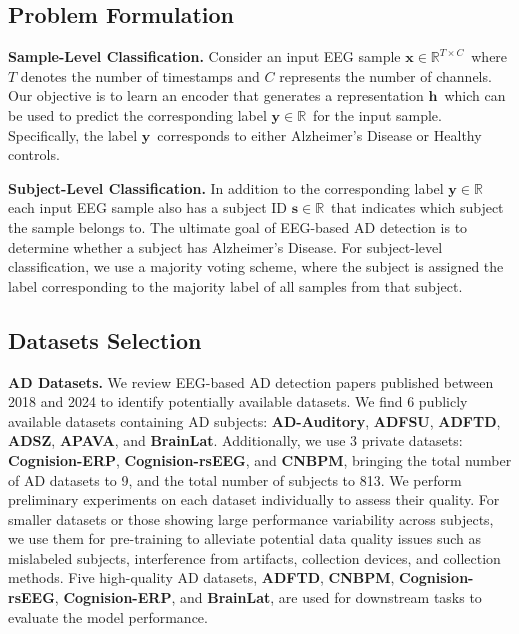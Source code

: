 




\subsection{Problem Formulation}
\label{sub:problem_formulation}


\textbf{Sample-Level Classification.}  
Consider an input EEG sample $\bm{x} \in \mathbb{R}^{T \times C}$\, where $T$ denotes the number of timestamps and $C$ represents the number of channels. Our objective is to learn an encoder that generates a representation $\bm{h}$\, which can be used to predict the corresponding label $\bm{y} \in \mathbb{R}$\ for the input sample. Specifically, the label $\bm{y}$\ corresponds to either Alzheimer's Disease or Healthy controls.

\textbf{Subject-Level Classification.}
In addition to the corresponding label $\bm{y} \in \mathbb{R}$\, each input EEG sample also has a subject ID $\bm{s} \in \mathbb{R}$\ that indicates which subject the sample belongs to. The ultimate goal of EEG-based AD detection is to determine whether a subject has Alzheimer's Disease. For subject-level classification, we use a majority voting scheme, where the subject is assigned the label corresponding to the majority label of all samples from that subject.



\subsection{Datasets Selection}
\label{sub:datasets_selection}

\textbf{AD Datasets.} We review EEG-based AD detection papers published between 2018 and 2024 to identify potentially available datasets. We find 6 publicly available datasets containing AD subjects: \textbf{AD-Auditory}\cite{lahijanian2024auditory}, \textbf{ADFSU}\cite{vicchietti2023computational}, \textbf{ADFTD}\cite{miltiadous2023dataset,miltiadous2023dice}, \textbf{ADSZ}\cite{alves2022eeg,pineda2020quantile}, \textbf{APAVA}\cite{escudero2006analysis,smith2017accounting}, and \textbf{BrainLat}\cite{prado2023brainlat}. Additionally, we use 3 private datasets: \textbf{Cognision-ERP}\cite{cecchi2015clinical}, \textbf{Cognision-rsEEG}, and \textbf{CNBPM}\cite{ieracitano2019time,amezquita2019novel}, bringing the total number of AD datasets to 9, and the total number of subjects to 813.  We perform preliminary experiments on each dataset individually to assess their quality. For smaller datasets or those showing large performance variability across subjects, we use them for pre-training to alleviate potential data quality issues such as mislabeled subjects, interference from artifacts, collection devices, and collection methods. Five high-quality AD datasets, \textbf{ADFTD}, \textbf{CNBPM}, \textbf{Cognision-rsEEG}, \textbf{Cognision-ERP}, and \textbf{BrainLat}, are used for downstream tasks to evaluate the model performance.

